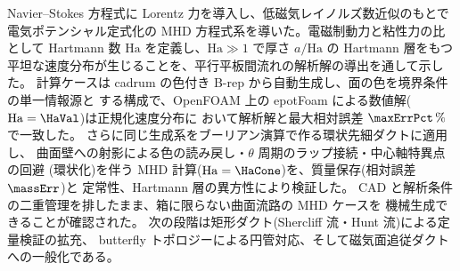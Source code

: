 \documentclass{ltjsarticle}   %
\newcommand{\Ha}{\mathrm{Ha}}
\begin{document}
Navier--Stokes 方程式に Lorentz 力を導入し、低磁気レイノルズ数近似のもとで
電気ポテンシャル定式化の MHD 方程式系を導いた。電磁制動力と粘性力の比として
Hartmann 数 $\Ha$ を定義し、$\Ha\gg1$ で厚さ $a/\Ha$ の Hartmann 層をもつ
平坦な速度分布が生じることを、平行平板間流れの解析解の導出を通して示した。
計算ケースは cadrum の色付き B-rep から自動生成し、面の色を境界条件の単一情報源と
する構成で、OpenFOAM 上の epotFoam による数値解($\Ha=\HaVal$)は正規化速度分布に
おいて解析解と最大相対誤差 $\maxErrPct\,\%$ で一致した。
さらに同じ生成系をブーリアン演算で作る環状先細ダクトに適用し、
曲面壁への射影による色の読み戻し・$\theta$ 周期のラップ接続・中心軸特異点の回避
(環状化)を伴う MHD 計算($\Ha=\HaCone$)を、質量保存(相対誤差 $\massErr$)と
定常性、Hartmann 層の異方性により検証した。
CAD と解析条件の二重管理を排したまま、箱に限らない曲面流路の MHD ケースを
機械生成できることが確認された。
次の段階は矩形ダクト(Shercliff 流・Hunt 流)による定量検証の拡充、
butterfly トポロジーによる円管対応、そして磁気面追従ダクトへの一般化である。



\end{document}
